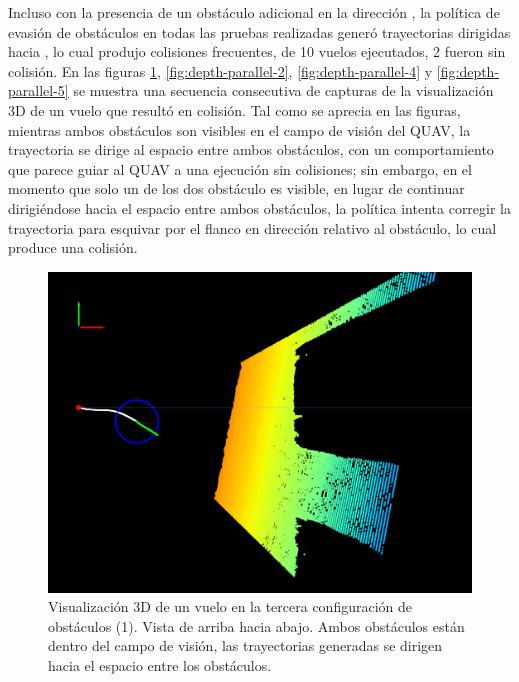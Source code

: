 Incluso con la presencia de un obstáculo adicional en la dirección , la política de evasión de obstáculos en todas las pruebas realizadas generó trayectorias dirigidas hacia , lo cual produjo colisiones frecuentes, de 10 vuelos ejecutados, 2 fueron sin colisión. En las figuras \ref{fig:depth-parallel-1}, \ref{fig:depth-parallel-2},  \ref{fig:depth-parallel-4} y \ref{fig:depth-parallel-5} se muestra una secuencia consecutiva de capturas de la visualización 3D de un vuelo que resultó en colisión. Tal como se aprecia en las figuras, mientras ambos obstáculos son visibles en el campo de visión del QUAV, la trayectoria se dirige al espacio entre ambos obstáculos, con un comportamiento que parece guiar al QUAV a una ejecución sin colisiones; sin embargo, en el momento que solo un de los dos obstáculo es visible, en lugar de continuar dirigiéndose hacia el espacio entre ambos obstáculos, la política intenta corregir la trayectoria para esquivar por el flanco en dirección  relativo al obstáculo, lo cual produce una colisión. 

\begin{figure}[H]
    \centering
    \includegraphics[scale=0.3]{partes/img/depth-parallel-1-topdown.png}
    \caption[Visualización 3D de un vuelo en la tercera configuración de obstáculos (1). Vista de arriba hacia abajo.]{Visualización 3D de un vuelo en la tercera configuración de obstáculos (1). Vista de arriba hacia abajo. Ambos obstáculos están dentro del campo de visión, las trayectorias generadas se dirigen hacia el espacio entre los obstáculos.}
    \label{fig:depth-parallel-1}
\end{figure}

